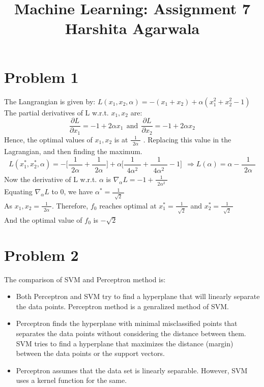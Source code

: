 \documentclass[10pt, a4paper, fleqn]{article}
\begin{document}
\title{Machine Learning: Assignment 7\\
Harshita Agarwala}
\maketitle
\section{Problem 1}
The Langrangian is given by: $L(x_1,x_2,\alpha) = -(x_1 + x_2) + \alpha(x_1^2 + x_2^2 -1)$ \\
The partial derivatives of L w.r.t. $x_1, x_2$ are:
\begin{equation*}
\frac{\partial L}{\partial x_1} = -1 + 2\alpha x_1 \ \ \text{and} \ \ \frac{\partial L}{\partial x_2} = -1 + 2\alpha x_2
\end{equation*}
Hence, the optimal values of $x_1, x_2$ is at $\frac{1}{\substack{2\alpha}}$ . Replacing this value in the Lagrangian, and then finding the maximum.
\begin{equation*}
L(x_1^*,x_2^*,\alpha) = -\Big[\frac{1}{\substack{2\alpha}} + \frac{1}{\substack{2\alpha}}\Big] + \alpha\Big[\frac{1}{\substack{4\alpha^2}} + \frac{1}{\substack{4\alpha^2}} -1\Big] \ \ 
\Rightarrow L(\alpha) = \alpha - \frac{1}{\substack{2\alpha}}
\end{equation*}
Now the derivative of L w.r.t. $\alpha$ is $\nabla_\alpha L = -1 + \frac{1}{\substack{2\alpha^2}}$\\
Equating $\nabla_\alpha L$ to 0, we have $\alpha^* = \frac{1}{\substack{\sqrt{2}}}$ \\
As $x_1, x_2 = \frac{1}{\substack{2\alpha}}$. Therefore, $f_0$ reaches optimal at $x_1^* = \frac{1}{\substack{\sqrt{2}}}$  and $x_2^* = \frac{1}{\substack{\sqrt{2}}}$\\
And the optimal value of $f_0$ is $-\sqrt{2}$
\section{Problem 2}
The comparison of SVM and Perceptron method is:
\begin{itemize}
\item Both Perceptron and SVM try to find a hyperplane that will linearly separate the data points. Perceptron method is a genralized method of SVM.
\item Perceptron finds the hyperplane with minimal misclassified points that separates the data points without considering the distance between them. SVM tries to find a hyperplane that maximizes the distance (margin) between the data points or the support vectors.
\item Perceptron assumes that the data set is linearly separable. However, SVM uses a kernel function for the same.
\end{itemize}
\end{document}
